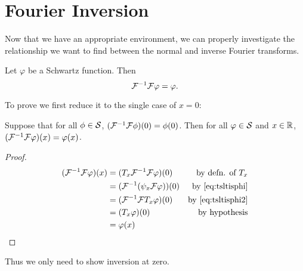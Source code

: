     \section{Fourier Inversion}
      Now that we have an appropriate environment, we can properly investigate the relationship we want to find between the normal and inverse Fourier transforms.
      \enlargethispage{1\baselineskip} %
      \begin{thm}
        \label{thm:fourinv}
        Let $\varphi$ be a Schwartz function.
        Then \[\F^{-1}\F \varphi = \varphi\text{.}\]
      \end{thm}
      To prove  we first reduce it to the single case of $x=0$:
      \begin{claim}
        Suppose that for all $\phi\in\S$, $(\F^{-1}\F\phi)(0) = \phi(0)$.
        Then for all $\varphi\in\S$ and $x\in\R$, $(\F^{-1}\F\varphi)(x)=\varphi(x)$.
        \begin{proof}
          \begin{align*}
            (\F^{-1}\F\varphi)(x) &= (T_x\F^{-1}\F\varphi)(0) &\text{by defn. of $T_x$}\\
            &= (\F^{-1}(\psi_x\F\varphi))(0) &\text{by \eqref{eq:tsltisphi}}\\
            &= (\F^{-1}\F T_x\varphi)(0)  &\text{by \eqref{eq:tsltisphi2}}\\
            &= (T_x\varphi)(0) &\text{by hypothesis}\\
            &= \varphi(x)
          \end{align*}
        \end{proof}
      \end{claim}
      Thus we only need to show inversion at zero.


